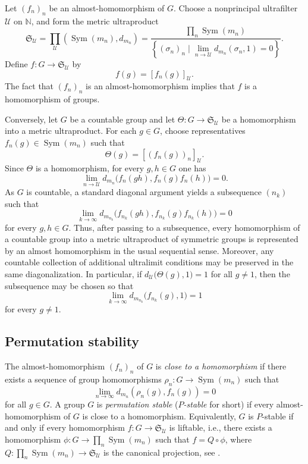 \documentclass[a4paper,12pt]{amsart}
\theoremstyle{plain}
\theoremstyle{definition}
\theoremstyle{remark}
\numberwithin{equation}{subsection}
\DeclareMathOperator{\Sym}{Sym}
\begin{document}
Let $(f_n)_n$ be an almost-homomorphism of $G$. Choose a nonprincipal ultrafilter $\mathcal{U}$ on $\mathbb{N}$, and form the metric ultraproduct \cite{Gol22}
$$\mathfrak{S}_{\mathcal{U}}=\prod_{\mathcal{U}} (\Sym(m_n),d_{m_n})=\frac{\prod_n \Sym(m_n)}{\left\{(\sigma_n)_n\mid \lim_{n\to\mathcal{U}}d_{m_n}(\sigma_n,1)=0\right\}}.$$
Define $f:G\to\mathfrak{S}_{\mathcal{U}}$ by
$$f(g)=[f_n(g)]_{\mathcal{U}}.$$
The fact that $(f_n)_n$ is an almost-homomorphism implies that $f$ is a homomorphism of groups. 

Conversely, 
let $G$ be a countable group and let
$\Theta:G\to\mathfrak{S}_\mathcal{U}$
be a homomorphism into a metric ultraproduct.  For each $g\in G$,
choose representatives
$f_n(g)\in\Sym(m_n)$
such that
$$\Theta(g)=[(f_n(g))_n]_{\mathcal U}.$$
Since $\Theta$ is a homomorphism, for every $g,h\in G$ one has
$$
\lim_{n\to\mathcal U}
d_{m_n}\bigl(f_n(gh),f_n(g)f_n(h)\bigr)=0.
$$
As $G$ is countable, a standard diagonal argument yields a subsequence $(n_k)$ such that
$$\lim_{k\to\infty}d_{m_{n_k}}\bigl(
f_{n_k}(gh),f_{n_k}(g)f_{n_k}(h)
\bigr) =0
$$
for every $g,h\in G$.  Thus, after passing to a subsequence, every
homomorphism of a countable group into a metric ultraproduct of
symmetric groups is represented by an almost homomorphism in the usual
sequential sense.  Moreover, any countable collection of additional
ultralimit conditions may be preserved in the same diagonalization. In
particular, if
$d_{\mathcal U}\bigl(\Theta(g),1\bigr)=1$ for all $g\neq 1$,
then the subsequence may be chosen so that
$$\lim_{k\to\infty}d_{m_{n_k}}\bigl(f_{n_k}(g),1\bigr) =1$$
for every $g\neq 1$.


\subsection{Permutation stability}
\label{ss:pstab_prelim}

The almost-homomorphism $(f_n)_n$ of $G$ is \emph{close to a homomorphism} if there exists a sequence of group homomorphisms $\rho_n:G\to \Sym(m_n)$ such that
$$\lim_{n\to \infty} d_{m_n}(\rho_n(g),f_n(g))=0$$
for all $g\in G$. A group $G$ is \emph{permutation stable} (\emph{$P$-stable} for short) if every almost-homomorphism of $G$ is close to a homomorphism. Equivalently, $G$ is $P$-stable if and only if every homomorphism $f:G\to\mathfrak{S}_\mathcal{U}$ is liftable, i.e., there exists a homomorphism $\phi:G\to\prod_n\Sym(m_n)$ such that $f=Q\circ \phi$, where $Q:\prod_n\Sym(m_n)\to\mathfrak{S}_\mathcal{U}$ is the canonical projection, see \cite[Theorem 4.2]{AP15}.
\end{document}
